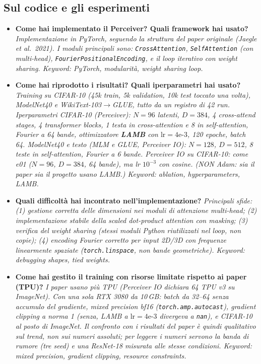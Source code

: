 \documentclass[
  11pt,
]{article}
\begin{document}
\subsection{Sul codice e gli esperimenti}

\begin{itemize}

  \item \textbf{Come hai implementato il Perceiver? Quali framework hai usato?}
  \textit{Implementazione in PyTorch, seguendo la struttura del paper originale (Jaegle et al.\ 2021). I moduli principali sono: \texttt{CrossAttention}, \texttt{SelfAttention} (con multi-head), \texttt{FourierPositionalEncoding}, e il loop iterativo con weight sharing. Keyword: PyTorch, modularità, weight sharing loop.}

  \item \textbf{Come hai riprodotto i risultati? Quali iperparametri hai usato?}
  \textit{Training su CIFAR-10 (45k train, 5k validation, 10k test toccato una volta), ModelNet40 e WikiText-103$\to$GLUE, tutto da un registro di 42 run. Iperparametri CIFAR-10 (Perceiver): $N=96$ latenti, $D=384$, 4 cross-attend stages, 4 transformer blocks, 1 testa in cross-attention e 8 in self-attention, Fourier a 64 bande, ottimizzatore \textbf{LAMB} con $\text{lr}=4\text{e-}3$, 120 epoche, batch 64. ModelNet40 e testo (MLM e GLUE, Perceiver IO): $N=128$, $D=512$, 8 teste in self-attention, Fourier a 6 bande. Perceiver IO su CIFAR-10: come e01 ($N=96$, $D=384$, 64 bande), ma lr $10^{-3}$ con cosine. (NON Adam: sia il paper sia il progetto usano LAMB.) Keyword: ablation, hyperparameters, LAMB.}

  \item \textbf{Quali difficoltà hai incontrato nell'implementazione?}
  \textit{Principali sfide: (1) gestione corretta delle dimensioni nei moduli di attenzione multi-head; (2) implementazione stabile della scaled dot-product attention con masking; (3) verifica del weight sharing (stessi moduli Python riutilizzati nel loop, non copie); (4) encoding Fourier corretto per input 2D/3D con frequenze \emph{linearmente} spaziate (\texttt{torch.linspace}, non bande geometriche). Keyword: debugging shapes, tied weights.}

  \item \textbf{Come hai gestito il training con risorse limitate rispetto ai paper (TPU)?}
  \textit{I paper usano più TPU (Perceiver IO dichiara 64 TPU v3 su ImageNet). Con una sola RTX 3080 da 10\,GB: batch da 32--64 senza accumulo del gradiente, mixed precision bf16 (\texttt{torch.amp.autocast}), gradient clipping a norma 1 (senza, LAMB a $\text{lr}=4\text{e-}3$ divergeva a \texttt{nan}), e CIFAR-10 al posto di ImageNet. Il confronto con i risultati del paper è quindi qualitativo sul trend, non sui numeri assoluti; per leggere i numeri servono la banda di rumore (tre seed) e una ResNet-18 misurata alle stesse condizioni. Keyword: mixed precision, gradient clipping, resource constraints.}

\end{itemize}
\end{document}
